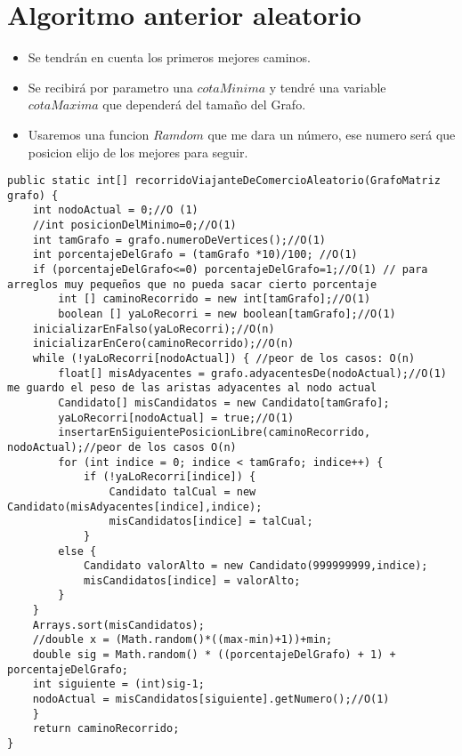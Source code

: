 \documentclass[a4paper,11pt]{article}
\begin{document}
\section{Algoritmo anterior aleatorio}
\begin{itemize}
  \item Se tendrán en cuenta los primeros mejores caminos.
  \item Se recibirá por parametro una $cotaMinima$ y tendré una variable $cotaMaxima$ que dependerá del tamaño del Grafo.
  \item Usaremos una funcion $Ramdom$ que me dara un número, ese numero será que posicion elijo de los mejores para seguir.
\end{itemize}
 \lstset{language=Java, breaklines=true, basicstyle=\footnotesize}
\begin{lstlisting}[frame=single]
  public static int[] recorridoViajanteDeComercioAleatorio(GrafoMatriz grafo) {
  	int nodoActual = 0;//O (1)
	//int posicionDelMinimo=0;//O(1)
	int tamGrafo = grafo.numeroDeVertices();//O(1)
	int porcentajeDelGrafo = (tamGrafo *10)/100; //O(1)
	if (porcentajeDelGrafo<=0) porcentajeDelGrafo=1;//O(1) // para arreglos muy pequeños que no pueda sacar cierto porcentaje
		int [] caminoRecorrido = new int[tamGrafo];//O(1)
		boolean [] yaLoRecorri = new boolean[tamGrafo];//O(1)
	inicializarEnFalso(yaLoRecorri);//O(n)
	inicializarEnCero(caminoRecorrido);//O(n)
	while (!yaLoRecorri[nodoActual]) { //peor de los casos: O(n)
		float[] misAdyacentes = grafo.adyacentesDe(nodoActual);//O(1) me guardo el peso de las aristas adyacentes al nodo actual
		Candidato[] misCandidatos = new Candidato[tamGrafo];
		yaLoRecorri[nodoActual] = true;//O(1)
		insertarEnSiguientePosicionLibre(caminoRecorrido, nodoActual);//peor de los casos O(n)
		for (int indice = 0; indice < tamGrafo; indice++) {
			if (!yaLoRecorri[indice]) {
				Candidato talCual = new Candidato(misAdyacentes[indice],indice);
				misCandidatos[indice] = talCual;
			}
		else {
			Candidato valorAlto = new Candidato(999999999,indice);
			misCandidatos[indice] = valorAlto;
		}
	}
	Arrays.sort(misCandidatos);
	//double x = (Math.random()*((max-min)+1))+min;
	double sig = Math.random() * ((porcentajeDelGrafo) + 1) + porcentajeDelGrafo;
	int siguiente = (int)sig-1;
	nodoActual = misCandidatos[siguiente].getNumero();//O(1)
	}
	return caminoRecorrido;
}

\end{lstlisting}
\end{document}
